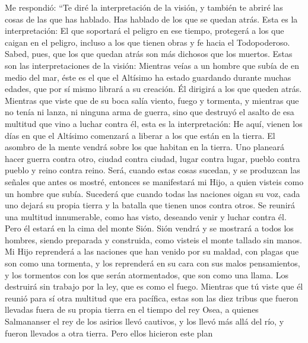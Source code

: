 Me respondió:  ``Te diré la interpretación de la visión,
y también te abriré las cosas de las que has hablado. 
Has hablado de los que se quedan atrás. Esta es la interpretación:
 El que soportará el peligro en ese tiempo, protegerá a
los que caigan en el peligro, incluso a los que tienen obras y fe hacia
el Todopoderoso.  Sabed, pues, que los que quedan atrás
son más dichosos que los muertos.  Estas son las
interpretaciones de la visión: Mientras veías a un hombre que subía de
en medio del mar,  éste es el que el Altísimo ha estado
guardando durante muchas edades, que por sí mismo librará a su creación.
Él dirigirá a los que queden atrás.  Mientras que viste
que de su boca salía viento, fuego y tormenta,  y
mientras que no tenía ni lanza, ni ninguna arma de guerra, sino que
destruyó el asalto de esa multitud que vino a luchar contra él, esta es
la interpretación:  He aquí, vienen los días en que el
Altísimo comenzará a liberar a los que están en la tierra.
 El asombro de la mente vendrá sobre los que habitan en
la tierra.  Uno planeará hacer guerra contra otro, ciudad
contra ciudad, lugar contra lugar, pueblo contra pueblo y reino contra
reino.  Será, cuando estas cosas sucedan, y se produzcan
las señales que antes os mostré, entonces se manifestará mi Hijo, a
quien visteis como un hombre que subía.  Sucederá que
cuando todas las naciones oigan su voz, cada uno dejará su propia tierra
y la batalla que tienen unos contra otros.  Se reunirá
una multitud innumerable, como has visto, deseando venir y luchar contra
él.  Pero él estará en la cima del monte Sión.
 Sión vendrá y se mostrará a todos los hombres, siendo
preparada y construida, como visteis el monte tallado sin manos.
 Mi Hijo reprenderá a las naciones que han venido por su
maldad, con plagas que son como una tormenta,  y los
reprenderá en su cara con sus malos pensamientos, y los tormentos con
los que serán atormentados, que son como una llama. Los destruirá sin
trabajo por la ley, que es como el fuego.  Mientras que
tú viste que él reunió para sí otra multitud que era pacífica,
 estas son las diez tribus que fueron llevadas fuera de
su propia tierra en el tiempo del rey Osea, a quienes Salmananser el rey
de los asirios llevó cautivos, y los llevó más allá del río, y fueron
llevados a otra tierra.  Pero ellos hicieron este plan
